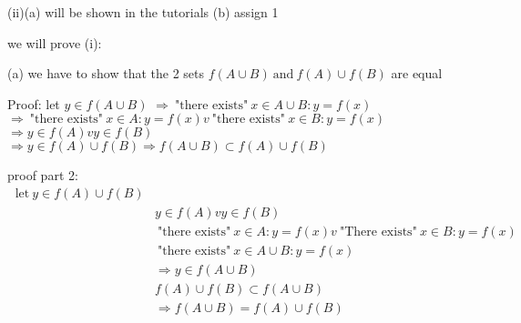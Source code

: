 \documentclass[class=scrartcl, crop=false]{standalone}
\begin{document}
(ii)(a) will be shown in the tutorials
(b) assign 1

we will prove (i):

(a) we have to show that the 2 sets $f(A \cup B) \ \text{and} \ f(A) \cup f(B)$ are equal

Proof:
let $y \in f(A \cup B)$ 
$\Rightarrow \ \text{"there exists"} \ x \in A \cup B: y = f(x)$
$\Rightarrow \ \text{"there exists"} \ x \in A: y = f(x) v \ \text{"there exists"} \ x \in B: y = f(x)$
$\Rightarrow y \in f(A) v y \in f(B)$ 
$\Rightarrow y \in f(A) \cup f(B) \Rightarrow f(A \cup B) \subset f(A) \cup f(B)$


proof part 2:
 \begin{align*}
   \ \text{let} \ y \in f(A) \cup f(B) \\
   & y \in f(A) v y \in f(B) \\
   & \ \text{"there exists"} \ x \in A: y = f(x) v \ \text{"There exists"} \ x \in B: y = f(x) \\
   & \ \text{"there exists"} \ x \in A \cup B: y = f(x) \\
   & \Rightarrow y \in f(A \cup B) \\
   & f(A) \cup f(B) \subset f(A \cup B) \\
   & \Rightarrow f(A \cup B) = f(A) \cup f(B)
\end{align*} 
\end{document}
